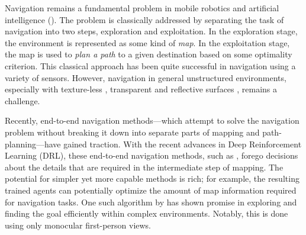 
Navigation remains a fundamental problem in mobile robotics and artificial intelligence (\cite{SmChIJRR1986,ElCOMPUTER1980}).
The problem is classically addressed by separating the task of navigation into two steps, exploration and exploitation. 
In the exploration stage, the environment is represented as some kind of \emph{map}. 
In the exploitation stage, the map is used to \emph{plan a path} to a given destination based on some optimality criterion. 
This classical approach has been quite successful in navigation using a variety of sensors.
However, navigation in general unstructured environments, especially with texture-less \cite{YaSoKaIROS2016}, transparent and reflective surfaces \cite{lai2011large}, remains a challenge.

Recently, end-to-end navigation methods---which attempt to  
solve the navigation problem without breaking it down into separate parts of mapping and path-planning---have gained traction.
With the recent advances in Deep Reinforcement Learning (DRL), these end-to-end navigation methods, such as \cite{MnBaMiICML2016,SiHuMaNATURE2016,LePaKrISER2017,MiPaViICLR2017,OhChSiICML2016}, forego decisions about the details that are required in the intermediate step of mapping.
The potential for simpler yet more capable methods is rich; for example, the resulting trained agents can potentially optimize the amount of map information required for navigation tasks.
One such algorithm by \cite{MiPaViICLR2017} has shown promise in exploring and finding the goal efficiently within complex environments. Notably, this is done using only monocular first-person views.

